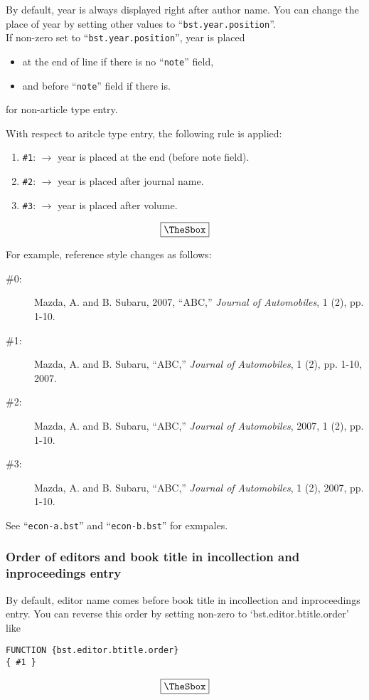 \documentclass[10pt]{article}
\newenvironment{Frame}%
{\setlength{\fboxsep}{15pt}
\setlength{\mylength}{\linewidth}%
\addtolength{\mylength}{-2\fboxsep}%
\addtolength{\mylength}{-2\fboxrule}%
\Sbox
\minipage{\mylength}%
\setlength{\abovedisplayskip}{0pt}%
\setlength{\belowdisplayskip}{0pt}%
}%
{\endminipage\endSbox
\[\fbox{\TheSbox}\]}
\begin{document}
By default, year is always displayed right after author name.  You can
change the place of year by setting other values to
``\texttt{bst.year.position}''.
\\

If non-zero set to ``\texttt{bst.year.position}'', year is placed
\begin{itemize}
 \item at the end of line if there is no ``\texttt{note}'' field, 
 \item and before ``\texttt{note}'' field if there is.
\end{itemize}
for non-article type entry.

With respect to aritcle type entry, the following rule is applied:
\begin{Frame}
\begin{enumerate}
 \item \verb|#1|: $\rightarrow$ year is placed at the end (before note field).
 \item \verb|#2|: $\rightarrow$ year is placed after journal name.
 \item \verb|#3|: $\rightarrow$ year is placed after volume.
\end{enumerate}
\end{Frame}

For example, reference style changes as follows:
\begin{description}
 \item[\#0: ] Mazda, A. and B. Subaru, 2007, ``ABC,'' \textit{Journal of
            Automobiles}, 1 (2), pp. 1-10.
 \item[\#1: ] Mazda, A. and B. Subaru, ``ABC,'' \textit{Journal of Automobiles},
            1 (2), pp. 1-10, 2007.
 \item[\#2: ] Mazda, A. and B. Subaru, ``ABC,'' \textit{Journal of Automobiles},
            2007, 1 (2), pp. 1-10.
 \item[\#3: ] Mazda, A. and B. Subaru, ``ABC,'' \textit{Journal of Automobiles},
            1 (2), 2007, pp. 1-10.
\end{description}

See ``\texttt{econ-a.bst}'' and ``\texttt{econ-b.bst}'' for exmpales.


\subsubsection{Order of editors and book title in incollection and inproceedings entry}

By default, editor name comes before book title in incollection and
inproceedings entry. You can reverse this order by
setting non-zero to `bst.editor.btitle.order' like
\begin{Frame}
\begin{verbatim}
FUNCTION {bst.editor.btitle.order}
{ #1 }
\end{verbatim}
\end{Frame}
\end{document}
